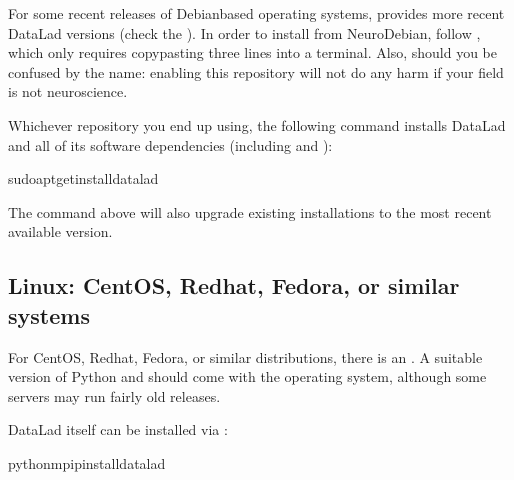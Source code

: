 \sphinxAtStartPar
For some recent releases of Debian\sphinxhyphen{}based operating systems,  provides more recent DataLad versions (check the
).  In order to
install from NeuroDebian, follow , which only requires
copy\sphinxhyphen{}pasting three lines into a terminal.  Also, should you be confused by the
name: enabling this repository will not do any harm if your field is not
neuroscience.

\sphinxAtStartPar
Whichever repository you end up using, the following command installs DataLad
and all of its software dependencies (including {\hyperref[\detokenize{glossary:term-git-annex}]{}} and ):

\begin{sphinxVerbatim}[commandchars=\\\{\}]
sudoapt\PYGZhy{}getinstalldatalad
\end{sphinxVerbatim}

\sphinxAtStartPar
The command above will also upgrade existing installations to the most recent
available version.

\ignorespaces 

\subsection{Linux: CentOS, Redhat, Fedora, or similar systems}
\label{\detokenize{intro/installation:linux-centos-redhat-fedora-or-similar-systems}}\label{\detokenize{intro/installation:index-10}}
\sphinxAtStartPar
For CentOS, Redhat, Fedora, or similar distributions, there is an .  A
suitable version of Python and {\hyperref[\detokenize{glossary:term-Git}]{}} should come with the operating
system, although some servers may run fairly old releases.

\sphinxAtStartPar
DataLad itself can be installed via :

\begin{sphinxVerbatim}[commandchars=\\\{\}]
python\PYGZhy{}mpipinstalldatalad
\end{sphinxVerbatim}

